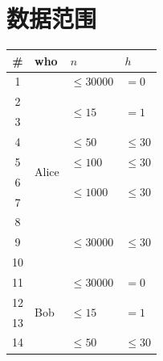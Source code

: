 \documentclass[11pt, a4paper]{article}
\begin{document}
\section*{数据范围}
\begin{center}
\begin{tabular}{|c|p{70pt}|p{70pt}|p{70pt}|}
    \hline
    \#    & who   & $n$  & $h$ \\
    \hline
    1    & \multirow{10}{*}{Alice} & $\leq 30000$                  & $= 0$                      \\
    \cline{1-1}\cline{3-4}
    2    &                         & \multirow{2}{*}{$\leq 15$}    & \multirow{2}{*}{$= 1$}     \\
    \cline{1-1}
    3    &                         &                               &                            \\
    \cline{1-1}\cline{3-4}
    4    &                         & \multirow{1}{*}{$\leq 50$}    & \multirow{1}{*}{$\leq 30$} \\
    \cline{1-1}\cline{3-4}
    5    &                         & \multirow{1}{*}{$\leq 100$}   & \multirow{1}{*}{$\leq 30$} \\
    \cline{1-1}\cline{3-4}
    6    &                         & \multirow{2}{*}{$\leq 1000$}  & \multirow{2}{*}{$\leq 30$} \\
    \cline{1-1}
    7    &                         &                               &                            \\
    \cline{1-1}\cline{3-4}
    8    &                         & \multirow{3}{*}{$\leq 30000$} & \multirow{3}{*}{$\leq 30$} \\
    \cline{1-1}
    9    &                         &                               &                            \\
    \cline{1-1}
    10   &                         &                               &                            \\
    \hline
    11   & \multirow{10}{*}{Bob}   & $\leq 30000$                  & $= 0$                      \\
    \cline{1-1}\cline{3-4}
    12   &                         & \multirow{2}{*}{$\leq 15$}    & \multirow{2}{*}{$= 1$}     \\
    \cline{1-1}
    13   &                         &                               &                            \\
    \cline{1-1}\cline{3-4}
    14   &                         & \multirow{1}{*}{$\leq 50$}    & \multirow{1}{*}{$\leq 30$} \\

\end{tabular}
\end{center}
\end{document}
